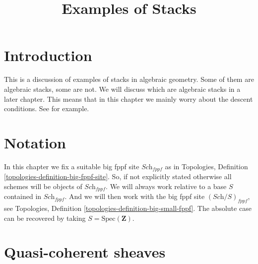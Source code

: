 

%


\title{Examples of Stacks}


\maketitle

\label{section-phantom}

\tableofcontents

\section{Introduction}
\label{section-introduction}

\noindent
This is a discussion of examples of stacks in algebraic geometry.
Some of them are algebraic stacks, some are not.
We will discuss which are algebraic stacks in a later chapter.
This means that in this chapter we mainly worry about the descent
conditions. See \cite{Vis2} for example.




\section{Notation}
\label{section-notation}

\noindent
In this chapter we fix a suitable big fppf site $\textit{Sch}_{fppf}$
as in Topologies, Definition \ref{topologies-definition-big-fppf-site}.
So, if not explicitly stated otherwise all schemes will be objects
of $\textit{Sch}_{fppf}$.
We will always work relative to a base $S$ contained in $\textit{Sch}_{fppf}$.
And we will then work with the big fppf site $(\textit{Sch}/S)_{fppf}$,
see Topologies, Definition \ref{topologies-definition-big-small-fppf}.
The absolute case can be recovered by taking
$S = \text{Spec}(\mathbf{Z})$.
 









\section{Quasi-coherent sheaves}
\label{section-stack-of-quasi-coherent-sheaves}

